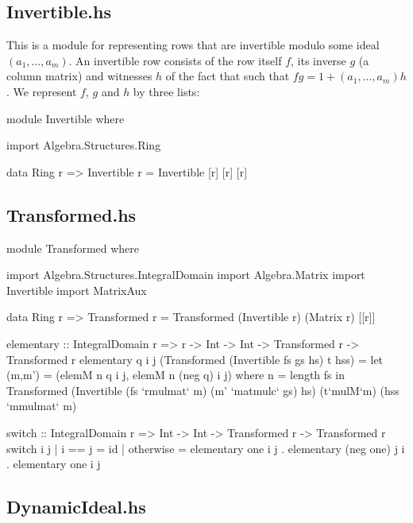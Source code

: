 

\subsection{Invertible.hs}

This is a module for representing rows that are invertible modulo some ideal $(a_1,\dots,a_m)$.
An invertible row consists of the row itself $f$, its inverse $g$ (a column matrix) and witnesses $h$ of the fact that
such that $fg = 1 + (a_1, \dots, a_m) h$.
We represent $f$, $g$ and $h$ by three lists:

\begin{code}
module Invertible where

import Algebra.Structures.Ring

data Ring r => Invertible r = Invertible [r] [r] [r]

\end{code}

\subsection{Transformed.hs}

\begin{code}
module Transformed where

import Algebra.Structures.IntegralDomain
import Algebra.Matrix
import Invertible
import MatrixAux

data Ring r => Transformed r =
  Transformed (Invertible r) (Matrix r) [[r]]

elementary :: IntegralDomain r =>
  r -> Int -> Int -> Transformed r -> Transformed r
elementary q i j (Transformed (Invertible fs gs hs) t hss) =
  let (m,m') = (elemM n q i j, elemM n (neg q) i j) where n = length fs in
  Transformed (Invertible (fs `rmulmat` m) (m' `matmulc` gs) hs)
              (t`mulM`m) (hss `mmulmat` m)

switch :: IntegralDomain r =>
  Int -> Int -> Transformed r -> Transformed r
switch i j
  | i == j = id
  | otherwise = elementary one i j .
                elementary (neg one) j i .
                elementary one i j
\end{code}

\subsection{DynamicIdeal.hs}

